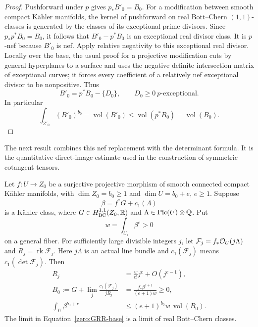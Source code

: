 \begin{proof}
Pushforward under \(p\) gives \(p_*B'_0=B_0\).  For a modification between
smooth compact Kähler manifolds,
the kernel of pushforward on real Bott--Chern \((1,1)\)-classes is generated
by the classes of its exceptional prime divisors.  Since
\(p_*p^*B_0=B_0\), it follows that \(B'_0-p^*B_0\) is an exceptional real
divisor class.  It is
\(p\)-nef because \(B'_0\) is nef.  Apply relative negativity to this
exceptional real divisor.  Locally over the base, the usual proof for a
projective modification cuts by general hyperplanes to a surface and
uses the negative definite intersection matrix of exceptional curves;
it forces every coefficient of a relatively nef exceptional divisor to
be nonpositive.  Thus
\[
 B'_0=p^*B_0-\{D_0\},\qquad D_0\ge0\ \text{\(p\)-exceptional}.
\]
In particular
\begin{equation}\label{zero:flattened-volume}
 \int_{Z'_0}(B'_0)^{b_0}
  =\operatorname{vol}(B'_0)\le\operatorname{vol}(p^*B_0)=\operatorname{vol}(B_0).
\end{equation}
\end{proof}

The next result combines this nef replacement with the determinant
formula.  It is the quantitative direct-image estimate used in the
construction of symmetric cotangent tensors.

\begin{lemma}\label{zero:direct-image}
Let \(f:U\to Z_0\) be a surjective projective morphism of smooth connected
compact Kähler manifolds, with
\(\dim Z_0=b_0\ge1\) and \(\dim U=b_0+e\), \(e\ge1\).  Suppose
\[
 \beta=f^*G+c_1(\Lambda)
\]
is a Kähler class, where \(G\in H^{1,1}_{\mathrm{BC}}(Z_0,\mathbb R)\) and
\(\Lambda\in\operatorname{Pic}(U)\otimes\mathbb Q\).  Put
\[
 w=\int_{U_z}\beta^e>0
\]
on a general fiber.  For sufficiently large divisible integers \(j\),
let \(\mathcal F_j=f_*\mathcal O_U(j\Lambda)\) and \(R_j=\operatorname{rk}\mathcal F_j\).
Here \(j\Lambda\) is an actual line bundle and
\(c_1(\mathcal F_j)\) means \(c_1(\det\mathcal F_j)\).  Then
\begin{align}
 R_j&=\frac{w}{e!}j^e+O(j^{e-1}),\label{zero:GRR-rank}\\
 B_0:=G+\lim_j\frac{c_1(\mathcal F_j)}{jR_j}
 &=\frac{f_*\beta^{e+1}}{(e+1)w}\ge0,\label{zero:GRR-base}\\
 \int_U\beta^{b_0+e}
 &\le (e+1)^{b_0}w\,\operatorname{vol}(B_0).\label{zero:mixed-bound}
\end{align}
The limit in Equation~\eqref{zero:GRR-base} is a limit of real Bott--Chern classes.
\end{lemma}

